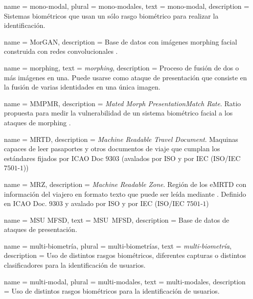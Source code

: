 {
    name        = {mono-modal},
    plural      = {mono-modales},
    text        = \mbox{mono-modal},
    description = {Sistemas biométricos que usan un sólo rasgo biométrico para realizar la identificación.}
}

{
    name        = {MorGAN},
    description = {Base de datos con imágenes \gls{morphing} facial construida con redes convolucionales  \cite{damer2018morgan}.}
}

{
    name        = {morphing},
    text        = {\mbox{\textit{morphing}}},
    description = {Proceso de fusión de dos o más imágenes en una. Puede usarse como ataque de presentación que consiste en la fusión de varias identidades en una única imagen.}
}

{
    name        = {MMPMR},
    description = {\textit{Mated Morph PresentationMatch Rate}. Ratio propuesta para medir la vulnerabilidad de un sistema biométrico facial a los ataques de \gls{morphing} \cite{scherhag2017biometric}.}
}

{
    name        = {MRTD},
    description = {\textit{Machine Readable Travel Document}. Maquinas capaces de leer pasaportes y otros documentos de viaje que cumplan los estándares fijados por ICAO Doc $9303$ (avalados por ISO y por IEC (ISO/IEC $7501$-$1$))}
}

{
    name        = {MRZ},
    description = {\textit{Machine Readable Zone}. Región de los \gls{eMRTD} con información del viajero en formato texto que puede ser leída mediante . Definido en ICAO Doc. $9303$ \cite{doc20069303} y avalado por ISO y por IEC (ISO/IEC $7501$-$1$) \cite{ISO/PADFramework}}
}

{
    name        = {MSU MFSD},
    text        = {\mbox{MSU MFSD}},
    description = {Base de datos de ataques de presentación.}
}

{
    name        = {multi-biometría},
    plural      = {multi-biometrías},
    text        = {\textit{multi-biometría}},
    description = {Uso de distintos rasgos biométricos, diferentes capturas o distintos clasificadores para la identificación de usuarios.}
}

{
    name        = {multi-modal},
    plural      = {multi-modales},
    text        = {\mbox{multi-modales}},
    description = {Uso de distintos rasgos biométricos para la identificación de usuarios.}
}

